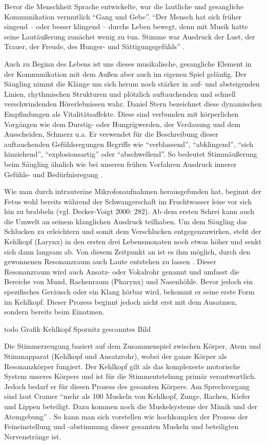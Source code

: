 Bevor die Menschheit Sprache entwickelte, war die lautliche und gesangliche Kommunikation vermutlich "`Gang und Gebe"'. "`Der Mensch hat sich früher singend – oder besser klingend – durchs Leben bewegt, denn mit Musik hatte seine Lautäußerung zunächst wenig zu tun. Stimme war Ausdruck der Lust, der Trauer, der Freude, des Hunger- und Sättigungsgefühls"' \autocite[8]{cramer1998}.

Auch zu Beginn des Lebens ist uns dieses musikalische, gesangliche Element in der Kommunikation mit dem Außen aber auch im eigenen Spiel geläufig. Der Säugling nimmt die Klänge um sich herum noch stärker in auf- und absteigenden Linien, rhythmischen Strukturen und plötzlich auftauchenden und schnell verschwindenden Hörerlebnissen wahr. Daniel Stern bezeichnet diese dynamischen Empfindungen als Vitalitätsaffekte. Diese sind verbunden mit körperlichen Vorgängen wie dem Durstig- oder Hungrigwerden, der Verdauung und dem Ausscheiden, Schmerz u.a. Er verwendet für die Beschreibung dieser auftauchenden Gefühlsregungen Begriffe wie "`verblassend"', "`abklingend"', "`sich hinziehend"', "`explosionsartig"' oder "`abschwellend"'.
So bedeutet Stimmäußerung beim Säugling ähnlich wie bei unseren frühen Vorfahren Ausdruck innerer Gefühls- und Bedürfnisregung \autocite[vgl.][83]{stern2007}. 

Wie man durch intrauterine Mikrofonaufnahmen herausgefunden hat, beginnt der Fetus wohl bereits während der Schwangerschaft im Fruchtwasser leise vor sich hin zu brabbeln (vgl. Decker-Voigt 2000: 282). Ab dem ersten Schrei kann auch die Umwelt an seinem klanglichen Ausdruck teilhaben. Um dem Säugling das Schlucken zu erleichtern und somit dem Verschlucken entgegenzuwirken, steht der Kehlkopf (Larynx) in den ersten drei Lebensmonaten noch etwas höher und senkt sich dann langsam ab. Von diesem Zeitpunkt an ist es ihm möglich, durch den gewonnenen Resonanzraum auch Laute entstehen zu lassen \autocite[vgl.][36]{cramer1998}. Dieser Resonanzraum wird auch Ansatz- oder Vokalrohr genannt und umfasst die Bereiche von Mund, Rachenraum (Pharynx) und Nasenhöhle. Bevor jedoch ein spezifisches Geräusch oder ein Klang hörbar wird, bekommt er seine erste Form im Kehlkopf. Dieser Prozess beginnt jedoch nicht erst mit dem Ausatmen, sondern bereits beim Einatmen. 

todo Grafik Kehlkopf Spornitz gescanntes Bild

Die Stimmerzeugung basiert auf dem Zusammenspiel zwischen Körper, Atem und Stimmapparat (Kehlkopf und Ansatzrohr), wobei der ganze Körper als Resonanzkörper fungiert. Der Kehlkopf gilt als das komplexeste motorische System unseres Körpers und ist für die Stimmentstehung primär verantwortlich. Jedoch bedarf er für diesen Prozess des gesamten Körpers. Am Sprechvorgang sind laut Cramer "`mehr als 100 Muskeln von Kehlkopf, Zunge, Rachen, Kiefer und Lippen beteiligt. Dazu kommen noch die Muskelsysteme der Mimik und der Atemgebung"' \autocite[40]{cramer1998}. So kann man sich vorstellen wie hochkomplex der Prozess der Feineinstellung und -abstimmung dieser gesamten Muskeln und beteiligten Nervenstränge ist. 

